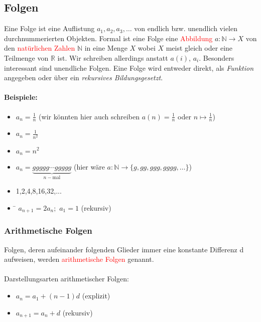 \subsection{Folgen}
Eine Folge ist eine Auflistung $a_1,a_2,a_3, \ldots$ von endlich bzw. unendlich vielen durchnummerierten Objekten. Formal ist eine Folge eine \textcolor{red}{Abbildung} $a : \mathbb{N} \to X$ von den \textcolor{red}{natürlichen Zahlen} $\mathbb{N}$ in eine Menge $X$ wobei $X$ meist gleich oder eine Teilmenge von $\mathbb{R}$ ist. Wir schreiben allerdings anstatt $a(i)$, $a_i$. Besonders interessant sind unendliche Folgen. Eine Folge wird entweder direkt, als \textit{Funktion} angegeben oder über ein \textit{rekursives Bildungsgesetzt}.

\paragraph{Beispiele:}
\begin{itemize}
\item $a_n = \frac{1}{n}$ (wir könnten hier auch schreiben $a(n) = \frac{1}{n}$ oder $n \mapsto \frac{1}{n}$)
\item $a_n = \frac{1}{n^{2}}$
\item $a_n = n^{2}$
\item $a_n = \underbrace{ggggg \cdots ggggg}_{n-\text{mal}}$ (hier wäre $a: \mathbb{N} \to \{g, gg, ggg, gggg, \ldots\}$)
\item 1,2,4,8,16,32,...
\item \begin{tabbing} 
\hspace{3.5 cm}\=\hspace{5 cm}\kill 
$a_{n+1} = 2a_n;$ \>$a_1 = 1$ (rekursiv)
\end{tabbing}
\end{itemize}

\subsubsection{Arithmetische Folgen}
Folgen, deren aufeinander folgenden Glieder immer eine konstante Differenz d aufweisen, werden \textcolor{red}{arithmetische Folgen} genannt.\\\\
Darstellungsarten arithmetischer Folgen:
\begin{itemize}
\item $a_n = a_1 + (n-1)d$ (explizit)
\item $a_{n+1} = a_n + d$ (rekursiv)
\end{itemize}
